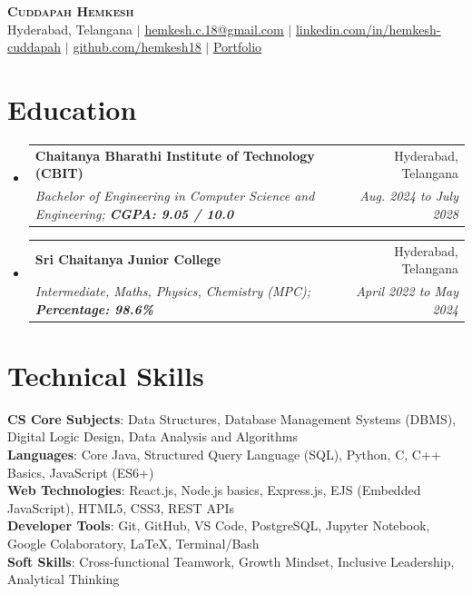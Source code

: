 \documentclass[letterpaper,10.8pt]{article}
\makeatletter
\newcommand{\resumeSubheading}[4]{
  \vspace{-2pt}\item
    \begin{tabular*}{0.97\textwidth}[t]{l@{\extracolsep{\fill}}r}
      \textbf{#1} & #2 \\
      \textit{\small#3} & \textit{\small #4} \\
    \end{tabular*}\vspace{-6pt}
}
\newcommand{\resumeSubHeadingListStart}{\begin{itemize}[leftmargin=0.15in, label={}]}
\newcommand{\resumeSubHeadingListEnd}{\end{itemize}}
\makeatother
\begin{document}
\begin{center}
    \textbf{\Huge \scshape Cuddapah Hemkesh} \\ \vspace{4pt}
    \small Hyderabad, Telangana $|$ 
    \href{mailto:hemkesh.c.18@gmail.com}{\underline{hemkesh.c.18@gmail.com}} $|$ 
    \href{https://www.linkedin.com/in/hemkesh-cuddapah-23a0033a1/}{\underline{linkedin.com/in/hemkesh-cuddapah}} $|$ 
    \href{https://github.com/hemkesh18}{\underline{github.com/hemkesh18}} $|$ 
    \href{https://portfolio-phi-sage-60.vercel.app/}{\underline{Portfolio}}
\end{center}

\section{Education}
  \resumeSubHeadingListStart
    \resumeSubheading
      {Chaitanya Bharathi Institute of Technology (CBIT)}{Hyderabad, Telangana}
      {Bachelor of Engineering in Computer Science and Engineering; \textbf{CGPA: 9.05 / 10.0}}{Aug. 2024 to July 2028}
    \resumeSubheading
      {Sri Chaitanya Junior College}{Hyderabad, Telangana}
      {Intermediate, Maths, Physics, Chemistry (MPC); \textbf{Percentage: 98.6\%}}{April 2022 to May 2024}
  \resumeSubHeadingListEnd

\section{Technical Skills}
 \begin{itemize}[leftmargin=0.15in, label={}]
    \small{\item{
     \textbf{CS Core Subjects}{: Data Structures, Database Management Systems (DBMS), Digital Logic Design, Data Analysis and Algorithms} \\
     \textbf{Languages}{: Core Java, Structured Query Language (SQL), Python, C, C++ Basics, JavaScript (ES6+)} \\
     \textbf{Web Technologies}{: React.js, Node.js basics, Express.js, EJS (Embedded JavaScript), HTML5, CSS3, REST APIs} \\
     \textbf{Developer Tools}{: Git, GitHub, VS Code, PostgreSQL, Jupyter Notebook, Google Colaboratory, LaTeX, Terminal/Bash} \\
     \textbf{Soft Skills}{: Cross-functional Teamwork, Growth Mindset, Inclusive Leadership, Analytical Thinking}
    }}
 \end{itemize}
 \vspace{-12pt}
\end{document}
